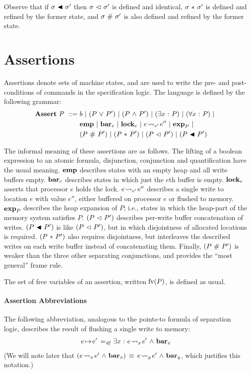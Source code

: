 \documentclass[11pt]{report}
\begin{document}
Observe that if $\sigma \operatorname{\,\blacktriangleleft\,} \sigma'$ then $\sigma \operatorname{\,\vartriangleleft\,} \sigma'$ is defined and identical, $\sigma \operatorname{\,\ast\,} \sigma'$ is defined and refined by the former state, and $\sigma \operatorname{\,\#\,} \sigma'$ is also defined and refined by the former state.

\section{Assertions}
\label{sec:assertions}

Assertions denote sets of machine states, and are used to write the pre- and post-conditions of commands in the specification logic. The language is defined by the following grammar: \begin{align*}
	\mathbf{Assert}~P ~::=~ & b ~|~ (P \operatorname{\,\vee\,} P') ~|~ (P \operatorname{\,\wedge\,} P') ~|~ (\exists x \operatorname{\,:\,} P) ~|~ (\forall x \operatorname{\,:\,} P) ~|~ \\
	& \mathbf{emp} ~|~ \mathbf{bar}_{e} ~|~ \mathbf{lock}_{e} ~|~ e \!\leadsto_{e'}\! e'' ~|~  \mathbf{exp}_{P} ~|~ \\ 
	& (P \operatorname{\,\#\,} P') ~|~ (P \operatorname{\,\ast\,} P') ~|~ (P \operatorname{\,\vartriangleleft\,} P') ~|~ (P \operatorname{\,\blacktriangleleft\,} P')
\end{align*} 

The informal meaning of these assertions are as follows. The lifting of a boolean expression to an atomic formula, disjunction, conjunction and quantification have the usual meaning. $\mathbf{emp}$ describes states with an empty heap and all write buffers empty. $\mathbf{bar}_{e}$ describes states in which just the $e$th buffer is empty. $\mathbf{lock}_{e}$ asserts that processor $e$ holds the lock. $e \!\leadsto_{e'}\! e''$ describes a single write to location $e$ with value $e''$, either buffered on processor $e$ or flushed to memory. $\mathbf{exp}_{P}$ describes the heap expansion of $P$; i.e., states in which the heap-part of the memory system satisfies $P$. $(P \operatorname{\,\vartriangleleft\,} P')$ describes per-write buffer concatenation of writes. $(P \operatorname{\,\blacktriangleleft\,} P')$ is like $(P \operatorname{\,\vartriangleleft\,} P')$, but in which disjointness of allocated locations is required. $(P \operatorname{\,\ast\,} P')$ also requires disjointness, but interleaves the described writes on each write buffer instead of concatenating them. Finally, $(P \operatorname{\,\#\,} P')$ is weaker than the three other separating conjunctions, and provides the ``most general'' frame rule. 

The set of free variables of an assertion, written $\mathrm{fv}(P)$, is defined as usual. 

\paragraph{Assertion Abbreviations} The following abbreviation, analogous to the points-to formula of separation logic, describes the result of flushing a single write to memory: \begin{align*}
	e \!\mapsto\! e' \operatorname{\;=_{\mathit{df}}\;} & \exists x \operatorname{\,:\,} e \!\leadsto_{x}\! e' \operatorname{\,\wedge\,} \mathbf{bar}_{x}\\
\end{align*} (We will note later that $(e \!\leadsto_{x}\! e' \operatorname{\,\wedge\,} \mathbf{bar}_{x})\,\equiv\, e \!\leadsto_{y}\! e' \operatorname{\,\wedge\,} \mathbf{bar}_{y}$, which justifies this notation.) 
\end{document}
